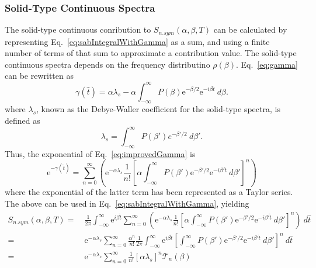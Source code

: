 \documentclass[../master.tex]{subfiles}
\begin{document}
			\subsubsection{Solid-Type Continuous Spectra}
				The solid-type continuous conribution to $S_{n.sym}(\alpha,\beta,T)$ can be calculated by representing Eq.~\ref{eq:sabIntegralWithGamma} as a sum, and using a finite number of terms of that sum to approximate a contribution value. The solid-type continuous spectra depends on the frequency distributino $\rho(\beta)$.
				Eq.~\ref{eq:gamma} can be rewritten as 
				\begin{equation} 
					\gamma(\hat{t})=\alpha\lambda_s-\alpha\int_{-\infty}^{\infty}P(\beta)\mathrm{e}^{-\beta/2}\mathrm{e}^{-i\beta\hat{t}}~d\beta.\label{eq:improvedGamma}
				\end{equation}
				where $\lambda_s$, known as the Debye-Waller coefficient for the solid-type spectra, is defined as 
				\begin{equation}
					\lambda_s = \int_{-\infty}^\infty P(\beta')e^{-\beta'/2}~d\beta'.
				\end{equation}
				Thus, the exponential of Eq.~\ref{eq:improvedGamma} is
				\begin{equation} 
					\mathrm{e}^{-\gamma(\hat{t})}=\sum_{n=0}^\infty\left(\mathrm{e}^{-\alpha\lambda_s}\frac{1}{n!}\left[\alpha\int_{-\infty}^{\infty}P(\beta')\mathrm{e}^{-\beta'/2}\mathrm{e}^{-i\beta'\hat{t}}~d\beta'\right]^n\right)
				\end{equation}
				where the exponential of the latter term has been represented as a Taylor series. The above can be used in Eq.~\ref{eq:sabIntegralWithGamma}, yielding
				\begin{align}
					S_{n.sym}(\alpha,\beta,T)=~&\frac{1}{2\pi}\int_{-\infty}^{\infty}\mathrm{e}^{i\beta\hat{t}}\sum_{n=0}^\infty\left(\mathrm{e}^{-\alpha\lambda_s}\frac{1}{n!}\left[\alpha\int_{-\infty}^{\infty}P(\beta')\mathrm{e}^{-\beta'/2}\mathrm{e}^{-i\beta'\hat{t}}~d\beta'\right]^n\right)~d\hat{t}\\
					=~&\mathrm{e}^{-\alpha\lambda_s}\sum_{n=0}^\infty\frac{\alpha^n}{n!}\frac{1}{2\pi}\int_{-\infty}^{\infty}\mathrm{e}^{i\beta\hat{t}}\left[\int_{-\infty}^{\infty}P(\beta')\mathrm{e}^{-\beta'/2}\mathrm{e}^{-i\beta'\hat{t}}~d\beta'\right]^n~d\hat{t}\\
					=~&\mathrm{e}^{-\alpha\lambda_{s}}\sum_{n=0}^{\infty}\frac{1}{n!}\left[\alpha\lambda_{s}\right]^{n}\mathcal{T}_{n}(\beta)\label{eq:sumToGetToContinSab}
				\end{align}
\end{document}
